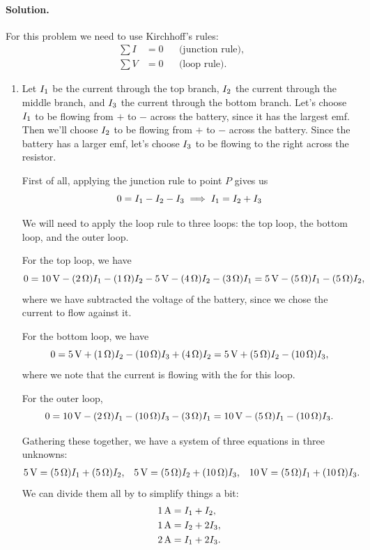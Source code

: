 \documentclass[11pt]{article}
\newcommand{\beq}{\begin{equation*}}
\newcommand{\eeq}{\end{equation*}}
\newenvironment{solution}
{
    \paragraph{Solution.}
    \ignorespaces
}
{
    \bigskip
}
\begin{document}
\begin{solution}
 	For this problem we need to use Kirchhoff's rules:
	\begin{align}
		\sum I &= 0 & &\text{(junction rule)}, \tag{26.5} \label{26.5} \\
		\sum V &= 0 & &\text{(loop rule)}. \tag{26.6} \label{26.6}
	\end{align}
	
	\begin{enumerate}
		\item Let $I_1$ be the current through the top branch, $I_2$ the current through the middle branch, and $I_3$ the current through the bottom branch.  Let's choose $I_1$ to be flowing from $+$ to $-$ across the  battery, since it has the largest emf.  Then we'll choose $I_2$ to be flowing from $+$ to $-$ across the  battery.  Since the  battery has a larger emf, let's choose $I_3$ to be flowing to the right across the  resistor.
		
		First of all, applying the junction rule to point $P$ gives us
		\beq
			0 = \Iq - \Iw - \Ie
			\implies
			\Iq = \Iw + \Ie
		\eeq
		
  We will need to apply the loop rule to three loops: the top loop, the bottom loop, and the outer loop.
		
		For the top loop, we have
		\beq
			0 = \Svolt{10} - (\Sohm{2}) \Iq - (\Sohm{1}) \Iw - \Svolt{5} - (\Sohm{4}) \Iw - (\Sohm{3}) \Iq
			= \Svolt{5} - (\Sohm{5}) \Iq - (\Sohm{5}) \Iw,
		\eeq
		where we have subtracted the voltage of the  battery, since we chose the current to flow against it.
		
		For the bottom loop, we have
		\beq
			0 = \Svolt{5} + (\Sohm{1}) \Iw - (\Sohm{10}) \Ie + (\Sohm{4}) \Iw
			= \Svolt{5} + (\Sohm{5}) \Iw - (\Sohm{10}) \Ie,
		\eeq
		where we note that the current is flowing with the  for this loop.
		
		For the outer loop,
		\beq
			0 = \Svolt{10} - (\Sohm{2}) \Iq - (\Sohm{10}) \Ie - (\Sohm{3}) \Iq
			= \Svolt{10} - (\Sohm{5}) \Iq - (\Sohm{10}) \Ie.
		\eeq
		
		Gathering these together, we have a system of three equations in three unknowns:
		\begin{align*}
			\SI{5}{\volt} &= (\SI{5}{\ohm}) I_1 + (\SI{5}{\ohm}) I_2, &
			\SI{5}{\volt} &= (\SI{5}{\ohm}) I_2 + (\SI{10}{\ohm}) I_3, &
			\SI{10}{\volt} &= (\SI{5}{\ohm}) I_1 + (\SI{10}{\ohm}) I_3.
		\end{align*}
		We can divide them all by  to simplify things a bit:
		\begin{align}
			\SI{1}{\ampere} &= I_1 + I_2, \label{A} \\
			\SI{1}{\ampere} &= I_2 + 2 I_3, \label{B} \\
			\SI{2}{\ampere} &= I_1 + 2 I_3. \label{C}
		\end{align}
		

\end{enumerate}
\end{solution}
\end{document}

